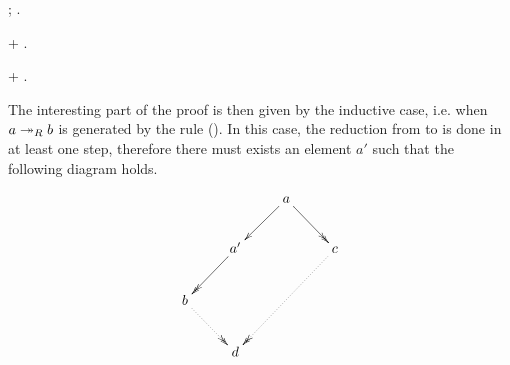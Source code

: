  \begin{coqdoccode}
\coqdocemptyline
\coqdocindent{2.00em}
\coqdoctac{\ensuremath{\exists}} ; . \end{coqdoccode}
 \begin{coqdoccode}
\coqdocemptyline
\coqdocindent{2.00em}
+ . \end{coqdoccode}
 \begin{coqdoccode}
\coqdocemptyline
\coqdocindent{2.00em}
+  . \end{coqdoccode}

 The interesting part of the proof is then given by the
        inductive case, i.e. when $a\twoheadrightarrow_R b$ is generated by the rule
        (). In this case, the reduction from  to  is
        done in at least one step, therefore there must exists an
        element $a'$ such that the following diagram holds.


         \[\xymatrix{ & & a \ar@{->}[dl] \ar@{->>}[dr] & \\ & a'
        \ar@{->>}[dl] & & c \ar@{.>>}[ddll] \\ b \ar@{.>>}[dr] & & &
        \\ & d & & }\]  


        

